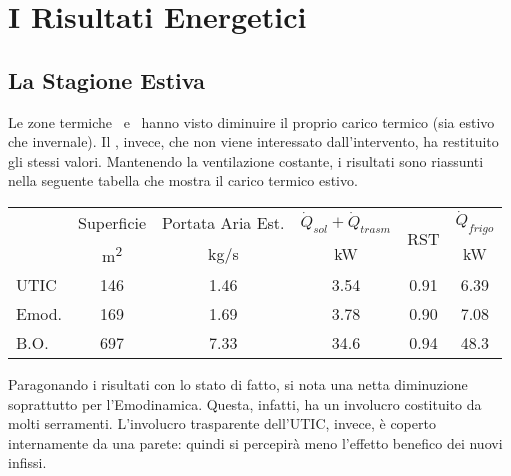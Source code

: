 \section{I Risultati Energetici}
\subsection{La Stagione Estiva}
Le zone termiche \utic\ e \emod\ hanno visto diminuire il proprio carico termico (sia estivo che invernale). Il \blocc, invece, che non viene interessato dall'intervento, ha restituito gli stessi valori. Mantenendo la ventilazione costante, i risultati sono riassunti nella seguente tabella che mostra il carico termico estivo.
\begin{center}
	\begin{tabular}{lccccc}
		\toprule
		&	Superficie 				&	Portata Aria Est. 			&	$\dot{Q}_{sol}+\dot{Q}_{trasm}$		& 	\multirow{2}{*}{RST}		&	$\dot{Q}_{frigo}$ 	\\
		&	{\small \si{m^2}}		&		{\small \si{kg/s}}		&		{\small \si{kW}}				&								&{\small \si{kW}}		\\					
		\midrule	
		UTIC		&		\num{146}			&		\num{1.46}				&	\num{3.54}		&	\num{0.91}					&	\num{6.39}		\\
		Emod.		&		\num{169}			&		\num{1.69}				&	\num{3.78}		&	\num{0.90}					&	\num{7.08}		\\
		B.O.		&		\num{697}			&		\num{7.33}				&	\num{34.6}		&	\num{0.94}					&	\num{48.3}		\\
		\bottomrule
	\end{tabular}
\end{center}
Paragonando i risultati con lo stato di fatto, si nota una netta diminuzione soprattutto per l'Emodinamica. Questa, infatti, ha un involucro costituito da molti serramenti. L'involucro trasparente dell'UTIC, invece, è coperto internamente da una parete: quindi si percepirà meno l'effetto benefico dei nuovi infissi.

